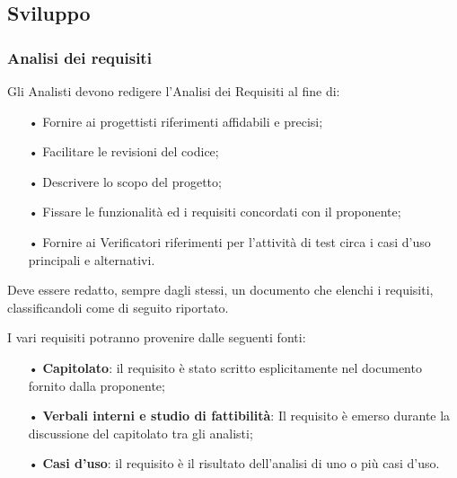 \subsection{Sviluppo}
\subsubsection{Analisi dei requisiti}
Gli Analisti devono redigere l'Analisi dei Requisiti al fine di:
\begin{itemize}
    \item[•] Fornire ai progettisti riferimenti affidabili e precisi;
    \item[•] Facilitare le revisioni del codice;
    \item[•] Descrivere lo scopo del progetto;
    \item[•] Fissare le funzionalità ed i requisiti concordati con il proponente;
    \item[•] Fornire ai Verificatori riferimenti per l'attività di test circa i casi d'uso principali e alternativi.
\end{itemize}

Deve essere redatto, sempre dagli stessi, un documento che elenchi i requisiti, classificandoli come di seguito riportato.

I vari {requisiti} potranno provenire dalle seguenti fonti:
\begin{itemize}
    \item[•] \textbf{Capitolato}: il requisito è stato scritto esplicitamente nel documento fornito dalla proponente;
    \item[•] \textbf{Verbali interni e studio di fattibilità}: Il requisito è emerso durante la discussione del capitolato tra gli analisti;
    \item[•] \textbf{Casi d'uso}: il requisito è il risultato dell'analisi di uno o più casi d'uso.
\end{itemize}

